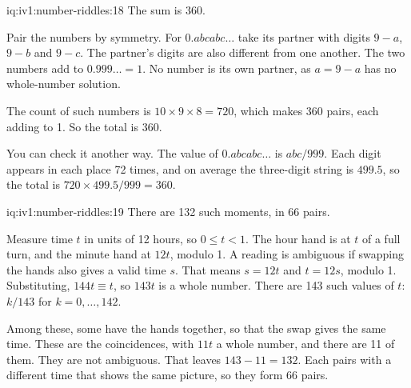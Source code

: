 \begin{solution}{iq:iv1:number-riddles:18}
The sum is 360.

Pair the numbers by symmetry. For $0.abcabc\dots$ take its partner with digits $9 - a$, $9 - b$ and $9 - c$. The partner's digits are also different from one another. The two numbers add to $0.999\dots = 1$. No number is its own partner, as $a = 9 - a$ has no whole-number solution.

The count of such numbers is $10 \times 9 \times 8 = 720$, which makes 360 pairs, each adding to 1. So the total is 360.

You can check it another way. The value of $0.abcabc\dots$ is $abc/999$. Each digit appears in each place 72 times, and on average the three-digit string is $499.5$, so the total is $720 \times 499.5 / 999 = 360$.

\end{solution}

\begin{solution}{iq:iv1:number-riddles:19}
There are 132 such moments, in 66 pairs.

Measure time $t$ in units of 12 hours, so $0 \le t < 1$. The hour hand is at $t$ of a full turn, and the minute hand at $12t$, modulo 1. A reading is ambiguous if swapping the hands also gives a valid time $s$. That means $s = 12t$ and $t = 12s$, modulo 1. Substituting, $144 t \equiv t$, so $143 t$ is a whole number. There are 143 such values of $t$: $k/143$ for $k = 0, \dots, 142$.

Among these, some have the hands together, so that the swap gives the same time. These are the coincidences, with $11t$ a whole number, and there are 11 of them. They are not ambiguous. That leaves $143 - 11 = 132$. Each pairs with a different time that shows the same picture, so they form 66 pairs.

\end{solution}

